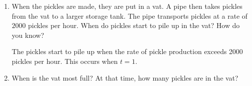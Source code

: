 \documentclass{article}
\begin{document}
\begin{enumerate}
\begin{enumerate}[resume]
      \begin{solution}
        This would double their production of pickles to 10,000. 
      \end{solution}

    \item
      \begin{problem}[\vfill]
        When the pickles are made, they are put in a vat.  A pipe then
        takes pickles from the vat to a larger storage tank. The pipe
        transports pickles at a rate of $2000$ pickles per hour. When do
        pickles start to pile up in the vat? How do you know?
      \end{problem}      

      \begin{solution}
        The pickles start to pile up when the rate of pickle production
        exceeds 2000 pickles per hour. This occurs when $\boxed{t=1}$.  
      \end{solution}

    \item
      \begin{problem}[\stretch{1.5}]
        When is the vat most full?  At that time, how many pickles are in
        the vat?
      \end{problem}


\end{enumerate}
\end{enumerate}
\end{document}
